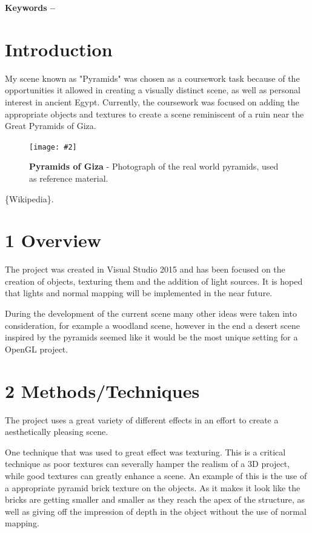 \documentclass[10pt, a4paper]{article}
\title{\mytitle}
\author{\myauthor\hspace{1em}\\\contact\\Edinburgh Napier University\hspace{0.5em}-\hspace{0.5em}\mymodule}
\date{}
\newcommand{\figuremacro}[5]{
    \begin{figure}[#1]
        \centering
        \texttt{[image: \#2]}
        \caption[#3]{\textbf{#3}#4}
        \label{fig:#2}
    \end{figure}
}
\begin{document}
	\maketitle
	\begin{abstract}
		The purpose of was to develop a 3D scene that demonstrate understanding of these features. At a minimum, textures and lighting will be implemented to add an element of realism.
		
		
	\end{abstract}
    
	\textbf{Keywords -- }{\mykeywords}
	\section{Introduction}
	My scene known as "Pyramids" was chosen as a coursework task because of the opportunities it allowed in creating a visually distinct scene, as well as personal interest in ancient Egypt. Currently, the coursework was focused on adding the appropriate objects and textures to create a scene reminiscent of a ruin near the Great Pyramids of Giza.
	
	 \figuremacro{h}{pyramids}{Pyramids of Giza}{ - Photograph of the real world pyramids, used as reference material.}{1.0}
	\{Wikipedia\}.
	
    \section{1 Overview}
    The project was created in Visual Studio 2015 and has been focused on the creation of objects, texturing them and the addition of light sources. 
    It is hoped that lights and normal mapping will be implemented in the near future.
    
    During the development of the current scene many other ideas were taken into consideration, for example a woodland scene, however in the end a desert scene inspired by the pyramids seemed like it would be the most unique setting for a OpenGL project.
    
    
    \section{2 Methods/Techniques}
    The project uses a great variety of different effects in an effort to create a aesthetically pleasing scene. 
    
    One technique that was used to great effect was texturing. This is a critical technique as poor textures can severally hamper the realism of a 3D project, while good textures can greatly enhance a scene. An example of this is the use of a appropriate pyramid brick texture on the objects. As it makes it look like the bricks are getting smaller and smaller as they reach the apex of the structure, as well as giving off the impression of depth in the object without the use of normal mapping.
    
\end{document}

